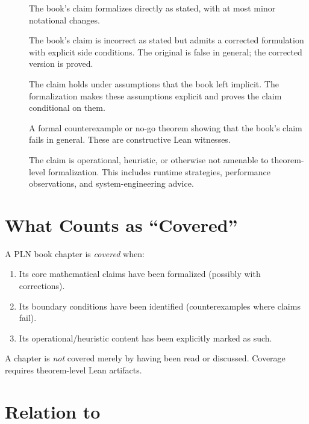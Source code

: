 \documentclass[11pt,openany]{report}
\begin{document}
\begin{description}
\item[\verdictClean{}] The book's claim formalizes directly as stated, with
  at most minor notational changes.

\item[\verdictCorrected{}] The book's claim is incorrect as stated but
  admits a corrected formulation with explicit side conditions.  The
  original is false in general; the corrected version is proved.

\item[\verdictAssumption{}] The claim holds under assumptions that the book
  left implicit.  The formalization makes these assumptions explicit and
  proves the claim conditional on them.

\item[\verdictNoGo{}] A formal counterexample or no-go theorem showing
  that the book's claim fails in general.  These are constructive Lean
  witnesses.

\item[\verdictHeuristic{}] The claim is operational, heuristic, or
  otherwise not amenable to theorem-level formalization.  This includes
  runtime strategies, performance observations, and system-engineering
  advice.
\end{description}

\section{What Counts as ``Covered''}

A PLN book chapter is \emph{covered} when:
\begin{enumerate}
\item Its core mathematical claims have been formalized (possibly with
  corrections).
\item Its boundary conditions have been identified (counterexamples where
  claims fail).
\item Its operational/heuristic content has been explicitly marked as such.
\end{enumerate}

A chapter is \emph{not} covered merely by having been read or discussed.
Coverage requires theorem-level Lean artifacts.

\section{Relation to \xiPLN{}}
\end{document}
